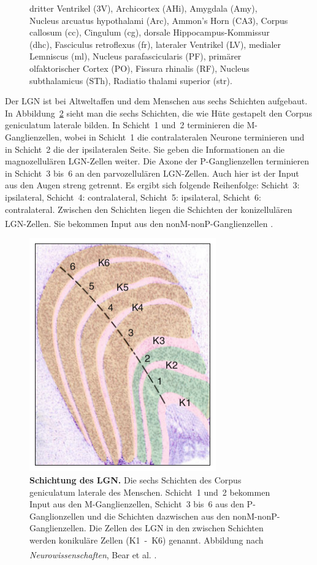 \documentclass[12pt,a4paper,pdftex]{article}
\begin{document}
\begin{figure}[H]
{    dritter Ventrikel (3V), Archicortex (AHi), Amygdala (Amy), Nucleus arcuatus hypothalami (Arc), Ammon's Horn (CA3), Corpus callosum (cc), Cingulum (cg), dorsale Hippocampus-Kommissur (dhc), Fasciculus retroflexus (fr), lateraler Ventrikel (LV), medialer Lemniscus (ml), Nucleus parafascicularis (PF),  primärer  olfaktorischer  Cortex (PO), Fissura rhinalis (RF), Nucleus subthalamicus (STh), Radiatio thalami superior (str).}
    \label{fig:LGN}
\end{figure}

Der LGN ist bei Altweltaffen und dem Menschen aus sechs Schichten aufgebaut. 
In Abbildung~\ref{fig:schichtung-LGN} sieht man die sechs Schichten, die wie Hüte gestapelt den Corpus geniculatum laterale bilden. In Schicht~1 und~2 terminieren die M-Ganglienzellen, wobei in Schicht~1 die contralateralen Neurone terminieren und in Schicht~2 die der ipsilateralen Seite. Sie geben die Informationen an die magnozellulären LGN-Zellen weiter. Die Axone der P-Ganglienzellen terminieren in Schicht~3 bis~6 an den parvozellulären LGN-Zellen. Auch hier ist der Input aus den Augen streng getrennt. Es ergibt sich folgende Reihenfolge: Schicht~3: ipsilateral, Schicht~4: contralateral, Schicht~5: ipsilateral, Schicht~6: contralateral.
Zwischen den Schichten liegen die Schichten der konizellulären LGN-Zellen. Sie bekommen Input aus den nonM-nonP-Ganglienzellen \textsuperscript{\cite[9.7]{heldmaier2003tierphysiologie}}.

\begin{figure}[H]
    \centering
    \includegraphics{pictures/visual/LGN_baer.png}
    \caption[Schichtung des LGN]{\textbf{Schichtung des LGN.} Die sechs Schichten des Corpus geniculatum laterale des Menschen. Schicht~1 und~2 bekommen Input aus den M-Ganglienzellen, Schicht~3 bis~6 aus den P-Ganglionzellen und die Schichten dazwischen aus den nonM-nonP-Ganglienzellen. Die Zellen des LGN in den zwischen Schichten werden konikuläre Zellen (K1~-~K6) genannt. Abbildung nach \textit{Neurowissenschaften}, Bear et al. \textsuperscript{\cite[10]{neurowissenschaften_baer}}.}
    \label{fig:schichtung-LGN}
\end{figure} 
\end{document}
